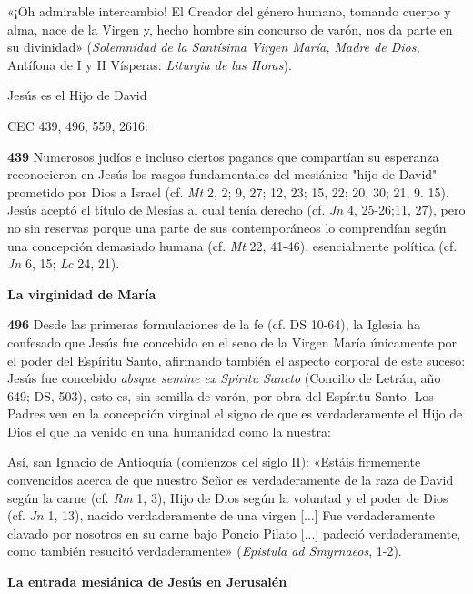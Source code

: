 \documentclass[]{article}
\begin{document}
«¡Oh admirable intercambio! El Creador del género humano, tomando cuerpo
y alma, nace de la Virgen y, hecho hombre sin concurso de varón, nos da
parte en su divinidad» (\emph{Solemnidad de la Santísima Virgen María,
Madre de Dios,} Antífona de I y II Vísperas: \emph{Liturgia de las
Horas}).

Jesús es el Hijo de David

CEC 439, 496, 559, 2616:  

\textbf{439} Numerosos judíos e incluso ciertos paganos que compartían
su esperanza reconocieron en Jesús los rasgos fundamentales del
mesiánico "hijo de David" prometido por Dios a Israel (cf. \emph{Mt} 2,
2; 9, 27; 12, 23; 15, 22; 20, 30; 21, 9. 15). Jesús aceptó el título de
Mesías al cual tenía derecho (cf. \emph{Jn} 4, 25-26;11, 27), pero no
sin reservas porque una parte de sus contemporáneos lo comprendían según
una concepción demasiado humana (cf. \emph{Mt} 22, 41-46), esencialmente
política (cf. \emph{Jn} 6, 15; \emph{Lc} 24, 21).

\textbf{La virginidad de María}

\textbf{496} Desde las primeras formulaciones de la fe (cf. DS 10-64),
la Iglesia ha confesado que Jesús fue concebido en el seno de la Virgen
María únicamente por el poder del Espíritu Santo, afirmando también el
aspecto corporal de este suceso: Jesús fue concebido \emph{absque semine
ex Spiritu Sancto} (Concilio de Letrán, año 649; DS, 503), esto es, sin
semilla de varón, por obra del Espíritu Santo. Los Padres ven en la
concepción virginal el signo de que es verdaderamente el Hijo de Dios el
que ha venido en una humanidad como la nuestra:

Así, san Ignacio de Antioquía (comienzos del siglo II): «Estáis
firmemente convencidos acerca de que nuestro Señor es verdaderamente de
la raza de David según la carne (cf. \emph{Rm} 1, 3), Hijo de Dios según
la voluntad y el poder de Dios (cf. \emph{Jn} 1, 13), nacido
verdaderamente de una virgen {[}...{]} Fue verdaderamente clavado por
nosotros en su carne bajo Poncio Pilato {[}...{]} padeció
verdaderamente, como también resucitó verdaderamente» (\emph{Epistula ad
Smyrnaeos}, 1-2).

\textbf{La entrada mesiánica de Jesús en Jerusalén}
\end{document}
